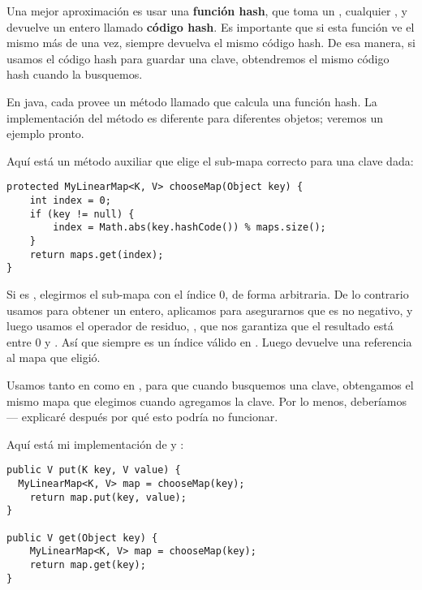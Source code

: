 \documentclass[12pt]{book}
\theoremstyle{exercise}
\begin{document}
Una mejor aproximación es usar una \textbf{función hash}, que toma un
, cualquier , y devuelve un entero llamado
\textbf{código hash}.  Es importante que si esta función ve el mismo 
más de una vez, siempre devuelva el mismo código hash. De esa manera, si
usamos el código hash para guardar una clave, obtendremos el mismo código
hash cuando la busquemos.


En java, cada  provee un método llamado
 que calcula una función hash. La implementación del
método es diferente para diferentes objetos; veremos un ejemplo
pronto.


Aquí está un método auxiliar que elige el sub-mapa correcto para
una clave dada:

\begin{verbatim}
protected MyLinearMap<K, V> chooseMap(Object key) {
    int index = 0;
    if (key != null) { 
        index = Math.abs(key.hashCode()) % maps.size();
    }
    return maps.get(index);
}
\end{verbatim}

Si  es , elegirmos el sub-mapa con el índice 0,
de forma arbitraria. De lo contrario usamos  para obtener un entero,
aplicamos  para asegurarnos que es no negativo,
y luego usamos el operador de residuo, \java{\%}, que nos garantiza que el
resultado está entre 0 y . Así que  siempre
es un índice válido en . Luego  devuelve una
referencia al mapa que eligió.


Usamos  tanto en  como en , para que
cuando busquemos una clave, obtengamos el mismo mapa que elegimos cuando
agregamos la clave. Por lo menos, deberíamos --- explicaré después por
qué esto podría no funcionar.

Aquí está mi implementación de  y :

\begin{verbatim}
public V put(K key, V value) {
  MyLinearMap<K, V> map = chooseMap(key);
    return map.put(key, value);
}

public V get(Object key) {
    MyLinearMap<K, V> map = chooseMap(key);
    return map.get(key);
}
\end{verbatim}
\end{document}
